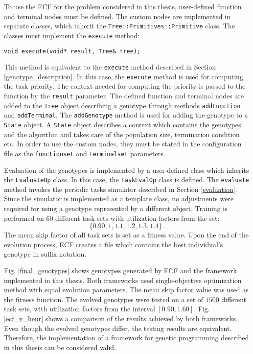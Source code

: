 To use the ECF for the problem considered in this thesis, user-defined function and terminal nodes must be defined.
The custom nodes are implemented in separate classes, which inherit the \texttt{Tree::Primitives::Primitive} class.
The classes must implement the \texttt{execute} method:
\begin{lstlisting}[frame=none, label={exec}, caption={A prototype of the \texttt{execute} method.}, captionpos=b]
    void execute(void* result, Tree& tree);
\end{lstlisting}
This method is equivalent to the \texttt{execute} method described in Section \ref{genotype_description}.
In this case, the \texttt{execute} method is used for computing the task priority.
The context needed for computing the priority is passed to the function by the \texttt{result} parameter.
The defined function and terminal nodes are added to the \texttt{Tree} object  describing a genotype through methods \texttt{addFunction} and \texttt{addTerminal}.
The \texttt{addGenotype} method is used for adding the genotype to a \texttt{State} object.
A \texttt{State} object describes a context which contains the genotypes and the algorithm and takes care of the population size, termination condition etc.
In order to use the custom nodes, they must be stated in the configuration file as the \texttt{functionset} and \texttt{terminalset} parameters.

Evaluation of the genotypes is implemented by a user-defined class which inherits the \texttt{EvaluateOp} class.
In this case, the \texttt{TaskEvalOp} class is defined.
The \texttt{evaluate} method invokes the periodic tasks simulator described in Section
\ref{evaluation}.
Since the simulator is implemented as a template class, no adjustments were required for using a genotype represented by a different object.
Training is performed on 60 different task sets with utilization factors from the set:
\begin{equation*}
\{ 0.90, 1, 1.1, 1.2, 1.3, 1.4 \} \, .
\end{equation*}
The mean skip factor of all task sets is set as a fitness value.
Upon the end of the evolution process, ECF creates a file which contains the best individual's genotype in suffix notation.

Fig. \ref{final_genotypes} shows genotypes generated by ECF and the framework implemented in this thesis. 
Both frameworks used single-objective optimization method with equal evolution parameters.
The mean skip factor value was used as the fitness function.
The evolved genotypes were tested on a set of $1500$ different task sets, with utilization factors from the interval $[0.90, 1.60]$.
Fig. \ref{ecf_v_heur} shows a comparison of the results achieved by both frameworks.
Even though the evolved genotypes differ, the testing results are equivalent.
Therefore, the implementation of a framework for genetic programming described in this thesis can be considered valid. 

